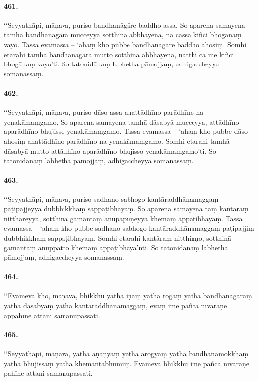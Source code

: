 \paragraph{461.} ‘‘Seyyathāpi, māṇava, puriso bandhanāgāre baddho assa. So aparena samayena tamhā bandhanāgārā mucceyya sotthinā abbhayena, na cassa kiñci bhogānaṃ vayo. Tassa evamassa – ‘ahaṃ kho pubbe bandhanāgāre baddho ahosiṃ. Somhi etarahi tamhā bandhanāgārā mutto sotthinā abbhayena, natthi ca me kiñci bhogānaṃ vayo’ti. So tatonidānaṃ labhetha pāmojjaṃ, adhigaccheyya somanassaṃ.

\paragraph{462.} ‘‘Seyyathāpi, māṇava, puriso dāso assa anattādhīno parādhīno na yenakāmaṃgamo. So aparena samayena tamhā dāsabyā mucceyya, attādhīno aparādhīno bhujisso yenakāmaṃgamo. Tassa evamassa – ‘ahaṃ kho pubbe dāso ahosiṃ anattādhīno parādhīno na yenakāmaṃgamo. Somhi etarahi tamhā dāsabyā mutto attādhīno aparādhīno bhujisso yenakāmaṃgamo’ti. So tatonidānaṃ labhetha pāmojjaṃ, adhigaccheyya somanassaṃ.

\paragraph{463.} ‘‘Seyyathāpi, māṇava, puriso sadhano sabhogo kantāraddhānamaggaṃ paṭipajjeyya dubbhikkhaṃ sappaṭibhayaṃ. So aparena samayena taṃ kantāraṃ nitthareyya, sotthinā gāmantaṃ anupāpuṇeyya khemaṃ appaṭibhayaṃ. Tassa evamassa – ‘ahaṃ kho pubbe sadhano sabhogo kantāraddhānamaggaṃ paṭipajjiṃ dubbhikkhaṃ sappaṭibhayaṃ. Somhi etarahi kantāraṃ nitthiṇṇo, sotthinā gāmantaṃ anuppatto khemaṃ appaṭibhaya’nti. So tatonidānaṃ labhetha pāmojjaṃ, adhigaccheyya somanassaṃ.

\paragraph{464.} ‘‘Evameva kho, māṇava, bhikkhu yathā iṇaṃ yathā rogaṃ yathā bandhanāgāraṃ yathā dāsabyaṃ yathā kantāraddhānamaggaṃ, evaṃ ime pañca nīvaraṇe appahīne attani samanupassati.

\paragraph{465.} ‘‘Seyyathāpi, māṇava, yathā āṇaṇyaṃ yathā ārogyaṃ yathā bandhanāmokkhaṃ yathā bhujissaṃ yathā khemantabhūmiṃ. Evameva bhikkhu ime pañca nīvaraṇe pahīne attani samanupassati.

